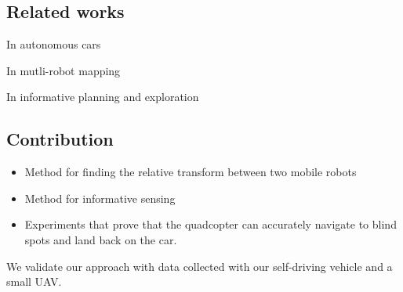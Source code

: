 \subsection{Related works}

In autonomous cars

In mutli-robot mapping

In informative planning and exploration

\subsection{Contribution}

\begin{itemize}
\item
Method for finding the relative transform between two mobile robots
\item
Method for informative sensing
\item
Experiments that prove that the quadcopter can accurately navigate
to blind spots and land back on the car.
\end{itemize}

We validate our approach with data collected with our self-driving vehicle and a small UAV.